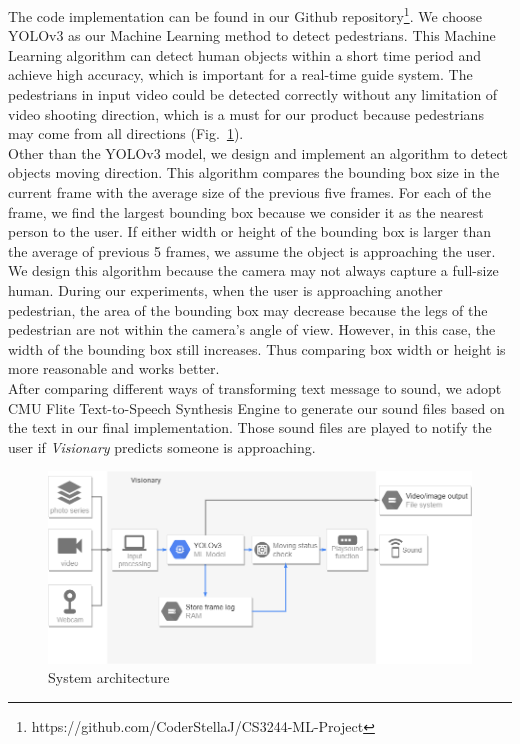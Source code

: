 \documentclass[letterpaper]{article} %
\begin{document}
\noindent The code implementation can be found in our Github repository\footnote{https://github.com/CoderStellaJ/CS3244-ML-Project}. We choose YOLOv3 as our Machine Learning method to detect pedestrians. This Machine Learning algorithm can detect human objects within a short time period and achieve high accuracy, which is important for a real-time guide system. The pedestrians in input video could be detected correctly without any limitation of video shooting direction, which is a must for our product because pedestrians may come from all directions (Fig.~\ref{fig:arc}). \\

\noindent Other than the YOLOv3 model, we design and implement an algorithm to detect objects moving direction. This algorithm compares the bounding box size in the current frame with the average size of the previous five frames. For each of the frame, we find the largest bounding box because we consider it as the nearest person to the user. If either width or height of the bounding box is larger than the average of previous 5 frames, we assume the object is approaching the user. We design this algorithm because the camera may not always capture a full-size human. During our experiments, when the user is approaching another pedestrian, the area of the bounding box may decrease because the legs of the pedestrian are not within the camera's angle of view. However, in this case, the width of the bounding box still increases. Thus comparing box width or height is more reasonable and works better. \\

\noindent After comparing different ways of transforming text message to sound, we adopt CMU Flite Text-to-Speech Synthesis Engine to generate our sound files based on the text in our final implementation. Those sound files are played to notify the user if \textit{Visionary} predicts someone is approaching. 
\begin{figure}[ht]
\hspace{-6mm}
\centering
\includegraphics[width=1.1\linewidth,height = 0.5\linewidth]{Figure/Code_structure_diagram.png}
\caption{\footnotesize{System architecture}}
\label{fig:arc}
\vspace{-2mm}
\end{figure}
\end{document}

